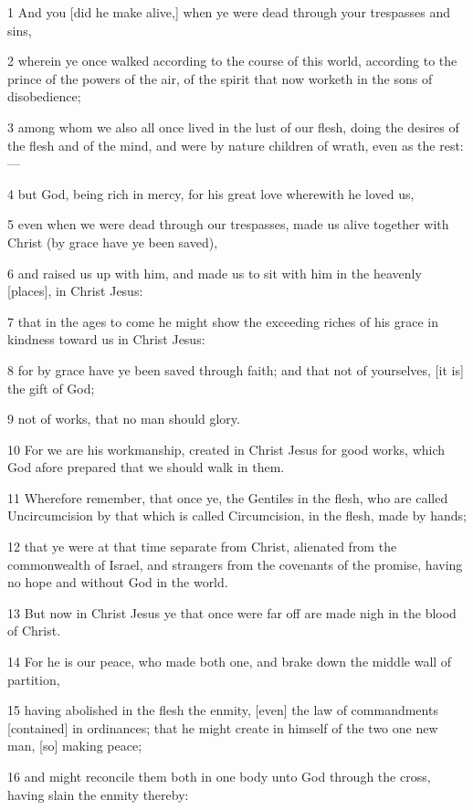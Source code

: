 \par 1 And you [did he make alive,] when ye were dead through your trespasses and sins,
\par 2 wherein ye once walked according to the course of this world, according to the prince of the powers of the air, of the spirit that now worketh in the sons of disobedience;
\par 3 among whom we also all once lived in the lust of our flesh, doing the desires of the flesh and of the mind, and were by nature children of wrath, even as the rest:—
\par 4 but God, being rich in mercy, for his great love wherewith he loved us,
\par 5 even when we were dead through our trespasses, made us alive together with Christ (by grace have ye been saved),
\par 6 and raised us up with him, and made us to sit with him in the heavenly [places], in Christ Jesus:
\par 7 that in the ages to come he might show the exceeding riches of his grace in kindness toward us in Christ Jesus:
\par 8 for by grace have ye been saved through faith; and that not of yourselves, [it is] the gift of God;
\par 9 not of works, that no man should glory.
\par 10 For we are his workmanship, created in Christ Jesus for good works, which God afore prepared that we should walk in them.
\par 11 Wherefore remember, that once ye, the Gentiles in the flesh, who are called Uncircumcision by that which is called Circumcision, in the flesh, made by hands;
\par 12 that ye were at that time separate from Christ, alienated from the commonwealth of Israel, and strangers from the covenants of the promise, having no hope and without God in the world.
\par 13 But now in Christ Jesus ye that once were far off are made nigh in the blood of Christ.
\par 14 For he is our peace, who made both one, and brake down the middle wall of partition,
\par 15 having abolished in the flesh the enmity, [even] the law of commandments [contained] in ordinances; that he might create in himself of the two one new man, [so] making peace;
\par 16 and might reconcile them both in one body unto God through the cross, having slain the enmity thereby:
